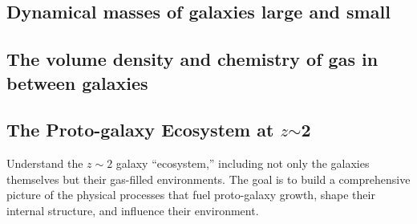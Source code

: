 
\subsection{Dynamical masses of galaxies large and small}

\noindent{}

\subsection{The volume density and chemistry of gas in between galaxies}

\noindent{}

\noindent{}

\subsection{The Proto-galaxy Ecosystem at $z$$\sim$2}
\label{sec:galaxies}

%
%
%
%


Understand the $z \sim 2$ galaxy ``ecosystem,'' including not only
the galaxies themselves but their gas-filled environments. The goal
is to build a comprehensive picture of the physical processes that
fuel proto-galaxy growth, shape their internal structure, and
influence their environment.

